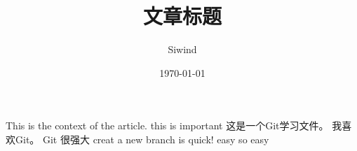 \documentclass[UTF8]{ctexart}
\title{文章标题}
\author{Siwind}
\date{\today}
\begin{document}
    \maketitle
    This is the context of the article.
    this is important
    这是一个Git学习文件。
    我喜欢Git。
    Git 很强大
    creat a new branch is quick!
    easy
    so easy
    
\end{document}
